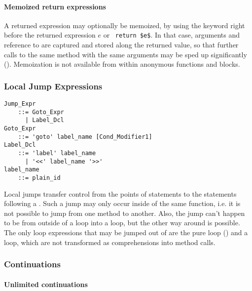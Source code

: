 \paragraph{Memoized return expressions}
A returned expression may optionally be memoized, by using the keyword  right before the returned expression $e$ or ~\lstinline!return $e$!. In that case, arguments and reference to  are captured and stored along the returned value, so that further calls to the same method with the same arguments may be sped up significantly (). Memoization is not available from within anonymous functions and blocks. 






\subsubsection{Local Jump Expressions}
\label{sec:local-jump-expressions}

\grammar\begin{lstlisting}
Jump_Expr 
    ::= Goto_Expr 
      | Label_Dcl
Goto_Expr 
    ::= 'goto' label_name [Cond_Modifier1]
Label_Dcl
    ::= 'label' label_name 
      | '<<' label_name '>>'
label_name 
    ::= plain_id
\end{lstlisting}

Local jumps transfer control from the points of  statements to the statements following a . Such a jump may only occur inside of the same function, i.e. it is not possible to jump from one method to another. Also, the jump can't happen to be from outside of a loop into a loop, but the other way around is possible. The only loop expressions that may be jumped out of are the pure loop () and a  loop, which are not transformed as comprehensions into method calls. 






\subsubsection{Continuations}
\label{sec:continuations}






\paragraph{Unlimited continuations}

